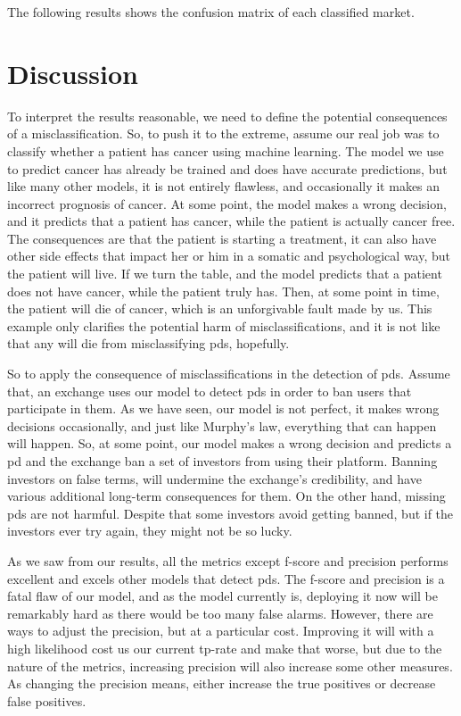 The following results shows the confusion matrix of each classified market.



\newpage
\section{Discussion}
To interpret the results reasonable, we need to define the potential consequences of a misclassification. So, to push it to the extreme, assume our real job was to classify whether a patient has cancer using machine learning. The model we use to predict cancer has already be trained and does have accurate predictions, but like many other models, it is not entirely flawless, and occasionally it makes an incorrect prognosis of cancer. At some point, the model makes a wrong decision, and it predicts that a patient has cancer, while the patient is actually cancer free. The consequences are that the patient is starting a treatment, it can also have other side effects that impact her or him in a somatic and psychological way, but the patient will live. If we turn the table, and the model predicts that a patient does not have cancer, while the patient truly has. Then, at some point in time, the patient will die of cancer, which is an unforgivable fault made by us. This example only clarifies the potential harm of misclassifications, and it is not like that any will die from misclassifying \acp{pd}, hopefully.

So to apply the consequence of misclassifications in the detection of \acp{pd}. Assume that, an exchange uses our model to detect \acp{pd} in order to ban users that participate in them. As we have seen, our model is not perfect, it makes wrong decisions occasionally, and just like Murphy's law, everything that can happen will happen. So, at some point, our model makes a wrong decision and predicts a \ac{pd} and the exchange ban a set of investors from using their platform. Banning investors on false terms, will undermine the exchange's credibility, and have various additional long-term consequences for them. On the other hand, missing \acp{pd} are not harmful. Despite that some investors avoid getting banned, but if the investors ever try again, they might not be so lucky.

As we saw from our results, all the metrics except f-score and precision performs excellent and excels other models that detect \acp{pd}. The f-score and precision is a fatal flaw of our model, and as the model currently is, deploying it now will be remarkably hard as there would be too many false alarms. However, there are ways to adjust the precision, but at a particular cost. Improving it will with a high likelihood cost us our current tp-rate and make that worse, but due to the nature of the metrics, increasing precision will also increase some other measures. As changing the precision means, either increase the true positives or decrease false positives.

